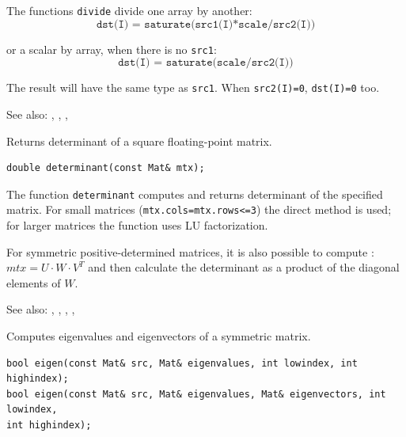The functions \texttt{divide} divide one array by another:
\[\texttt{dst(I) = saturate(src1(I)*scale/src2(I))} \]

or a scalar by array, when there is no \texttt{src1}:
\[\texttt{dst(I) = saturate(scale/src2(I))} \]

The result will have the same type as \texttt{src1}. When \texttt{src2(I)=0}, \texttt{dst(I)=0} too.

See also: , , , 

\label{determinant}

Returns determinant of a square floating-point matrix.

\begin{lstlisting}
double determinant(const Mat& mtx);
\end{lstlisting}
\begin{description}
\end{description}

The function \texttt{determinant} computes and returns determinant of the specified matrix. For small matrices (\texttt{mtx.cols=mtx.rows<=3})
the direct method is used; for larger matrices the function uses LU factorization.

For symmetric positive-determined matrices, it is also possible to compute : $mtx=U \cdot W \cdot V^T$ and then calculate the determinant as a product of the diagonal elements of $W$.

See also: , , , , 

\label{eigen}
Computes eigenvalues and eigenvectors of a symmetric matrix.

\begin{lstlisting}
bool eigen(const Mat& src, Mat& eigenvalues, int lowindex, int highindex);
bool eigen(const Mat& src, Mat& eigenvalues, Mat& eigenvectors, int lowindex,
int highindex);
\end{lstlisting}
\begin{description}
\end{description}

